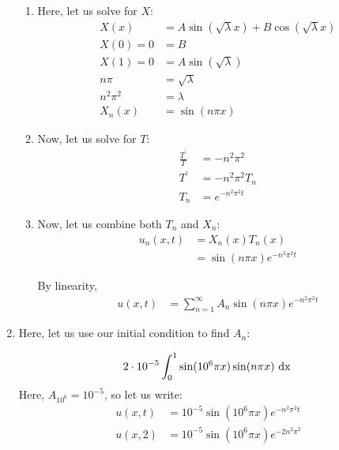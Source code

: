 \documentclass{article}
\begin{document}
\begin{enumerate}
\begin{enumerate}
    \item Here, let us solve for $X$:
    \begin{align}
      X(x) & = A \sin( \sqrt \lambda x) + B \cos( \sqrt \lambda x)\\
      X(0) = 0 & = B\\
      X(1) = 0 & = A \sin( \sqrt \lambda )\\
      n \pi & = \sqrt \lambda\\
      n^2 \pi^2 & = \lambda\\
      X_n(x) & = \sin(n \pi x)
    \end{align}

    \item Now, let us solve for $T$:
    \begin{align}
      \frac{T^\prime}{T} & = - n^2 \pi^2\\
      T^\prime & = - n^2 \pi^2 T_n\\
      T_n & = e^{-n^2 \pi^2 t}
    \end{align}

    \item Now, let us combine both $T_n$ and $X_n$:
    \begin{align}
      u_n(x, t) & = X_n(x)T_n(x)\\
      & = \sin(n \pi x) e^{-n^2 \pi^2 t}
    \end{align}

    By linearity,
    \begin{align}
      u(x, t) & =
      \sum^\infty_{n = 1}
      A_n
      \sin(n \pi x)
      e^{-n^2 \pi^2 t}
    \end{align}
  \end{enumerate}

  \item Here, let us use our initial condition to find $A_n$:

  \begin{align}
    2 \cdot 10^{-5} \int^1_0 \sin(10^6 \pi x) \sin(n \pi x) \text{ dx }
  \end{align}
  Here, $A_{10^6} = 10^{-5}$, so let us write:
  \begin{align}
    u(x, t) & = 10^{-5} \sin(10^6 \pi x)e^{-n^2 \pi^2 t}\\
    u(x, 2) & = 10^{-5} \sin(10^6 \pi x)e^{-2 n^2 \pi^2} %
  \end{align}
\end{enumerate}
\end{document}
